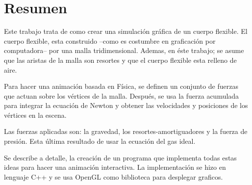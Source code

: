 \chapter*{Resumen}
Este trabajo trata de como crear una simulación gráfica de un cuerpo flexible.
El cuerpo flexible, esta construido --como es costumbre en graficación por computadora-- por una malla tridimensional. Ademas, en éste trabajo; se asume que las aristas de la malla son resortes y que el cuerpo flexible esta relleno de aire.

Para hacer una animación basada en Física, se definen un conjunto de fuerzas que actuan sobre los vértices de la malla. Después, se usa la fuerza acumulada para integrar la ecuación de Newton y obtener las velocidades y posiciones de los vértices en la escena.

Las fuerzas aplicadas son: la gravedad, los resortes-amortiguadores y la fuerza de presión. Esta última resultado de usar la ecuación del gas ideal.

Se describe a detalle, la creación de un programa que implementa todas estas ideas para hacer una animación interactiva. La implementación se hizo en lenguaje C++ y se usa OpenGL como biblioteca para desplegar graficos.

